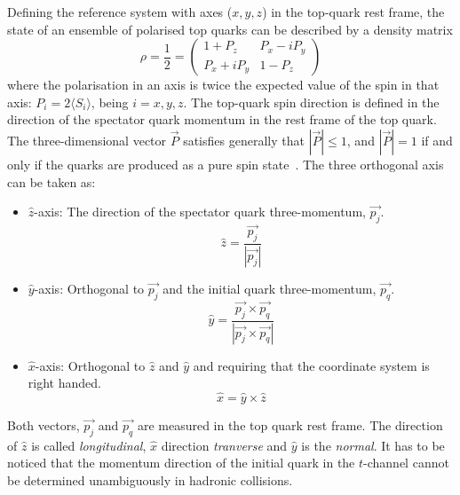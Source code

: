 Defining the reference system with axes ($x,y,z$) in the top-quark rest frame, the state of an ensemble of polarised top quarks can be described by a density matrix
\begin{equation} \label{eq:spin-desnity-matrix}
\rho= \frac{1}{2} = \begin{pmatrix} 1+P_z & P_x -iP_y\\ P_x+iP_y & 1-P_z \end{pmatrix}
\end{equation}
where the polarisation in an axis is twice the expected value of the spin in that axis: $P_i=2\langle S_i \rangle$, being $i=x,y,z$. The top-quark spin direction is defined in the direction of the spectator quark momentum in the rest frame of the top quark. The three-dimensional vector $\overrightarrow{P}$ satisfies generally that $|\overrightarrow{P}| \leq 1$, and $|\overrightarrow{P}|=1$ if and only if the quarks are produced as a pure spin state~\cite{AguilarSaavedra:2010nx}. The three orthogonal axis can be taken as: 
\begin{itemize}
\item $\hat{z}$-axis: The direction of the spectator quark three-momentum, $\overrightarrow{p_j}$.
\begin{equation} \label{eq:z-axis}
\hat{z}=\frac{\overrightarrow{p_j}}{|\overrightarrow{p_j}|}
\end{equation}
\item $\hat{y}$-axis: Orthogonal to $\overrightarrow{p_j}$ and the initial quark three-momentum, $\overrightarrow{p_q}$.
\begin{equation} \label{eq:y-axis}
\hat{y}=\frac{\overrightarrow{p_j} \times \overrightarrow{p_q}}{|\overrightarrow{p_j} \times \overrightarrow{p_q}|}
\end{equation}
\item $\hat{x}$-axis: Orthogonal to $\hat{z}$ and $\hat{y}$ and requiring that the coordinate system is right handed.
\begin{equation} \label{eq:x-axis}
\hat{x}=\hat{y}\times \hat{z}
\end{equation}
\end{itemize}

Both vectors, $\overrightarrow{p_j}$ and $\overrightarrow{p_q}$ are measured in the top quark rest frame. The direction of $\hat{z}$ is called \textit{longitudinal}, $\hat{x}$ direction \textit{tranverse} and $\hat{y}$ is the \textit{normal}. It has to be noticed that the momentum direction of the initial quark in the $t$-channel cannot be determined unambiguously in hadronic collisions.%


